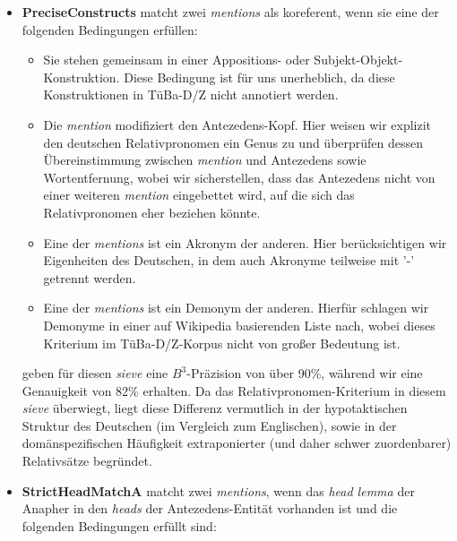 \documentclass{scrartcl}
\begin{document}
\begin{itemize}
\item \textbf{PreciseConstructs} matcht zwei \textit{mentions} als koreferent, wenn sie eine der folgenden Bedingungen erfüllen: 
\begin{itemize}
	\item Sie stehen gemeinsam in einer Appositions- oder Subjekt-Objekt-Konstruktion. Diese Bedingung ist für uns unerheblich, da diese Konstruktionen in TüBa-D/Z nicht annotiert werden.
	\item Die \textit{mention} modifiziert den Antezedens-Kopf. Hier weisen wir explizit den deutschen Relativpronomen ein Genus zu und überprüfen dessen Übereinstimmung zwischen \textit{mention} und Antezedens sowie Wortentfernung, wobei wir sicherstellen, dass das Antezedens nicht von einer weiteren \textit{mention} eingebettet wird, auf die sich das Relativpronomen eher beziehen könnte.
	\item Eine der \textit{mentions} ist ein Akronym der anderen. Hier berücksichtigen wir Eigenheiten des Deutschen, in dem auch Akronyme teilweise mit '-' getrennt werden.
	\item Eine der \textit{mentions} ist ein Demonym der anderen. Hierfür schlagen wir Demonyme in einer auf Wikipedia basierenden Liste nach, wobei dieses Kriterium im TüBa-D/Z-Korpus nicht von großer Bedeutung ist.
\end{itemize}
 geben für diesen \textit{sieve} eine $B^3$-Präzision von über 90\%, während wir eine Genauigkeit von 82\% erhalten. Da das Relativpronomen-Kriterium in diesem \textit{sieve} überwiegt, liegt diese Differenz vermutlich in der hypotaktischen Struktur des Deutschen (im Vergleich zum Englischen), sowie in der domänspezifischen Häufigkeit extraponierter (und daher schwer zuordenbarer) Relativsätze begründet.

\item \textbf{StrictHeadMatchA} matcht zwei \textit{mentions}, wenn das \textit{head lemma} der Anapher in den \textit{heads} der Antezedens-Entität vorhanden ist und die folgenden Bedingungen erfüllt sind:



\end{itemize}
\end{document}
